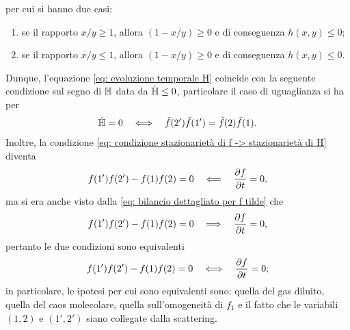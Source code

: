 per cui si hanno due casi:
\begin{enumerate}
    \item se il rapporto $x/y \ge 1$, allora $(1 - x/y) \ge 0$ e di conseguenza $h(x,y) \le 0$;
    \item se il rapporto $x/y \le 1$, allora $(1 - x/y) \ge 0$ e di conseguenza $h(x,y) \le 0$.
\end{enumerate}
Dunque, l'equazione \eqref{eq: evoluzione temporale H} coincide con la seguente condizione sul segno di $\mathbb{H}$ data da $\dot{\mathbb{H}} \le 0$, particolare il caso di uguaglianza si ha per
\begin{equation}
    \dot{\mathbb{H}} = 0\quad\Longleftrightarrow\quad \tilde{f}(2')\tilde{f}(1') = \tilde{f}(2)\tilde{f}(1).
\end{equation}
Inoltre, la condizione \eqref{eq: condizione stazionarietà di f -> stazionarietà di H} diventa 
\begin{equation}
    f(1')f(2') - f(1)f(2) = 0 \quad\Longleftarrow\quad \frac{\partial f}{\partial t} = 0,
\end{equation}
ma si era anche visto dalla \eqref{eq: bilancio dettagliato per f tilde} che 
\begin{equation}
    f(1')f(2') - f(1)f(2) = 0 \quad\Longrightarrow\quad \frac{\partial f}{\partial t} = 0,
\end{equation}
pertanto le due condizioni sono equivalenti 
\begin{equation}
    f(1')f(2') - f(1)f(2) = 0 \quad\Longleftrightarrow\quad \frac{\partial f}{\partial t} = 0;
\end{equation}
in particolare, le ipotesi per cui sono equivalenti sono: quella del gas diluito, quella del caos molecolare, quella sull'omogeneità di $f_1$ e il fatto che le variabili $(1,2)$ e $(1',2')$ siano collegate dalla scattering. 

